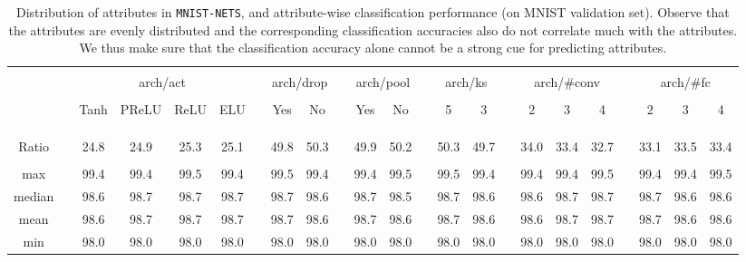 \documentclass{article} %
\newcommand{\metamnist}{\texttt{MNIST-NETS}\xspace}
\begin{document}
\begin{table}
\scriptsize
\caption{\label{tab:mnist-attr}Distribution of attributes in \metamnist, and attribute-wise classification performance (on MNIST validation set). Observe that the attributes are evenly distributed and the corresponding classification accuracies also do not correlate much with the attributes. We thus make sure that the classification accuracy alone cannot be a strong cue for predicting attributes.}
\vspace{0em}
\begin{centering}
\setlength{\tabcolsep}{0.3em}
\begin{tabular}{cc*{4}{c}c*{2}{c}c*{2}{c}c*{2}{c}c*{3}{c}c*{3}{c}}
\hspace{-0.8em} & \tabularnewline
 & \hspace{1em} & \multicolumn{4}{c}{arch/act}  && \multicolumn{2}{c}{arch/drop} & & \multicolumn{2}{c}{arch/pool} && \multicolumn{2}{c}{arch/ks} && \multicolumn{3}{c}{arch/\#\ignorespaces conv} && \multicolumn{3}{c}{arch/\#\ignorespaces fc} \tabularnewline
 \cline{3-6}   \cline{8-9}    \cline{11-12}    \cline{14-15}  \cline{17-19} \cline{21-23}
\vspace{-1em} &  &  &  &  &  &  & & & \tabularnewline
 & \hspace{0.5em}& Tanh & PReLU & ReLU & ELU & \hspace{0.5em} & Yes & No & \hspace{0.5em} & Yes & No & \hspace{0.5em} & 5 & 3 & \hspace{0.5em} & 2 & 3 & 4 & \hspace{0.5em} & 2 & 3 &  4 \tabularnewline
\vspace{-1em} &   \tabularnewline
\cline{1-1} \cline{3-6}   \cline{8-9}    \cline{11-12}    \cline{14-15}  \cline{17-19} \cline{21-23}
\vspace{-1em} &   \tabularnewline
\cline{1-1} \cline{3-6}   \cline{8-9}    \cline{11-12}    \cline{14-15}  \cline{17-19} \cline{21-23}
\vspace{-0.8em} &   \tabularnewline
Ratio   && 24.8 & 24.9 & 25.3 & 25.1 && 49.8 & 50.3 && 49.9 & 50.2 && 50.3 & 49.7 && 34.0 & 33.4 &  32.7 && 33.1 & 33.5 & 33.4 \tabularnewline
\cline{1-1} \cline{3-6}   \cline{8-9}    \cline{11-12}    \cline{14-15}  \cline{17-19} \cline{21-23}
\vspace{-0.8em} &   \tabularnewline
max    && 99.4 & 99.4 & 99.5 & 99.4 && 99.5 & 99.4 && 99.4 & 99.5 && 99.5 & 99.4 && 99.4 & 99.4 &  99.5 && 99.4 & 99.4 & 99.5 \tabularnewline
median && 98.6 & 98.7 & 98.7 & 98.7 && 98.7 & 98.6 && 98.7 & 98.5 && 98.7 & 98.6 && 98.6 & 98.7 &  98.7 && 98.7 & 98.6 & 98.6 \tabularnewline
mean   && 98.6 & 98.7 & 98.7 & 98.7 &&98.7 & 98.6 && 98.7 & 98.6 && 98.7 & 98.6 && 98.6 & 98.7 &  98.7 && 98.7 & 98.6 & 98.6 \tabularnewline
min    && 98.0 & 98.0 & 98.0 & 98.0 && 98.0 & 98.0 && 98.0 & 98.0 && 98.0 & 98.0 && 98.0 & 98.0 &  98.0 && 98.0 & 98.0 & 98.0 \tabularnewline
\cline{1-1} \cline{3-6}   \cline{8-9}    \cline{11-12}    \cline{14-15}  \cline{17-19} \cline{21-23}
\end{tabular}


\end{centering}
\end{table}
\end{document}
